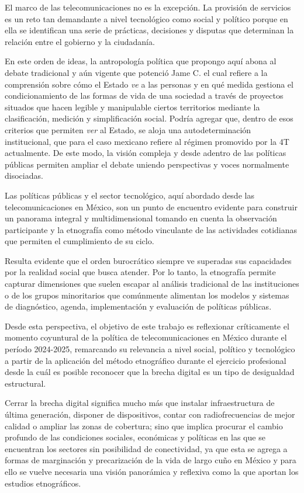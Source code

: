 \documentclass[
  spanish,
  11pt,
  a4paper,
]{scrbook}
\begin{document}
El marco de las telecomunicaciones no es la excepción. La provisión de
servicios es un reto tan demandante a nivel tecnológico como social y
político porque en ella se identifican una serie de prácticas,
decisiones y disputas que determinan la relación entre el gobierno y la
ciudadanía.

En este orden de ideas, la antropología política que propongo aquí abona
al debate tradicional y aún vigente que potenció Jame C.
\textcite{Scott1998} el cual refiere a la comprensión sobre cómo el
Estado \emph{ve} a las personas y en qué medida gestiona el
condicionamiento de las formas de vida de una sociedad a través de
proyectos situados que hacen legible y manipulable ciertos territorios
mediante la clasificación, medición y simplificación social. Podría
agregar que, dentro de esos criterios que permiten \emph{ver} al Estado,
se aloja una autodeterminación institucional, que para el caso mexicano
refiere al régimen promovido por la 4T actualmente. De este modo, la
visión compleja y desde adentro de las políticas públicas permiten
ampliar el debate uniendo perspectivas y voces normalmente disociadas.

Las políticas públicas y el sector tecnológico, aquí abordado desde las
telecomunicaciones en México, son un punto de encuentro evidente para
construir un panorama integral y multidimensional tomando en cuenta la
observación participante y la etnografía como método vinculante de las
actividades cotidianas que permiten el cumplimiento de su ciclo.

Resulta evidente que el orden burocrático siempre ve superadas sus
capacidades por la realidad social que busca atender. Por lo tanto, la
etnografía permite capturar dimensiones que suelen escapar al análisis
tradicional de las instituciones o de los grupos minoritarios que
comúnmente alimentan los modelos y sistemas de diagnóstico, agenda,
implementación y evaluación de políticas públicas.

Desde esta perspectiva, el objetivo de este trabajo es reflexionar
críticamente el momento coyuntural de la política de telecomunicaciones
en México durante el período 2024-2025, remarcando su relevancia a nivel
social, político y tecnológico a partir de la aplicación del método
etnográfico durante el ejercicio profesional desde la cuál es posible
reconocer que la brecha digital es un tipo de desigualdad estructural.

Cerrar la brecha digital significa mucho más que instalar
infraestructura de última generación, disponer de dispositivos, contar
con radiofrecuencias de mejor calidad o ampliar las zonas de cobertura;
sino que implica procurar el cambio profundo de las condiciones
sociales, económicas y políticas en las que se encuentran los sectores
sin posibilidad de conectividad, ya que esta se agrega a formas de
marginación y precarización de la vida de largo cuño en México y para
ello se vuelve necesaria una visión panorámica y reflexiva como la que
aportan los estudios etnográficos.
\end{document}
